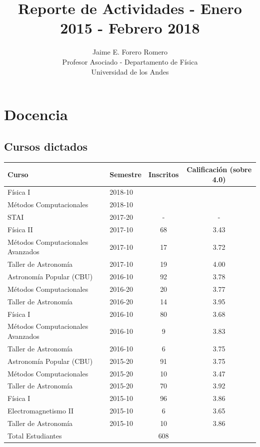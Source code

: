 \documentclass{article}
\title{Reporte de Actividades - Enero 2015 - Febrero 2018}
\author{Jaime E. Forero Romero\\Profesor Asociado - Departamento de
  F\'isica\\Universidad de los Andes}
\begin{document}
\maketitle
\tableofcontents
\newpage

\section{Docencia}

\subsection{Cursos dictados}
\begin{tabular}{p{6.5cm} l c c}\hline
Curso & Semestre & Inscritos & Calificaci\'on (sobre
4.0)\\\hline
F\'isica I & 2018-10 &  & \\\hline
M\'etodos Computacionales & 2018-10 &  & \\\hline
STAI & 2017-20 & - & -\\\hline
F\'isica II & 2017-10 & 68 & 3.43\\
M\'etodos Computacionales Avanzados & 2017-10 & 17 & 3.72\\ 
Taller de Astronom\'ia & 2017-10 & 19 & 4.00\\\hline
Astronom\'ia Popular (CBU) & 2016-10 & 92 & 3.78\\
M\'etodos Computacionales & 2016-20 & 20 & 3.77\\
Taller de Astronom\'ia & 2016-20 & 14 & 3.95\\\hline
F\'isica I & 2016-10 & 80 & 3.68\\
M\'etodos Computacionales Avanzados & 2016-10 & 9 & 3.83\\
Taller de Astronom\'ia & 2016-10 & 6 & 3.75\\\hline
Astronom\'ia Popular (CBU) & 2015-20 & 91 & 3.75\\ 
M\'etodos Computacionales & 2015-20 & 10 & 3.47\\
Taller de Astronom\'ia & 2015-20 & 70 & 3.92\\\hline
F\'isica I & 2015-10 & 96 & 3.86\\
Electromagnetismo II & 2015-10 & 6 & 3.65 \\
Taller de Astronom\'ia & 2015-10 & 10 & 3.86\\\hline
Total Estudiantes & & 608 & \\\hline
\end{tabular}
\end{document}
